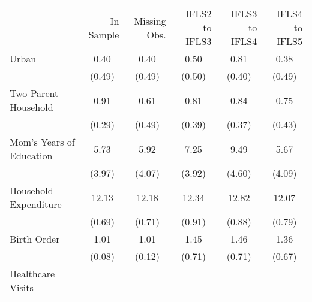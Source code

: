 \begin{tabular}{llllll}
\cline{1-6}
\multicolumn{1}{c}{} &
  \multicolumn{1}{|r}{In Sample} &
  \multicolumn{1}{r}{Missing Obs.} &
  \multicolumn{1}{r}{IFLS2 to IFLS3} &
  \multicolumn{1}{r}{IFLS3 to IFLS4} &
  \multicolumn{1}{r}{IFLS4 to IFLS5} \\
\cline{1-6}
\multicolumn{1}{l}{Urban} &
  \multicolumn{1}{|c}{0.40} &
  \multicolumn{1}{c}{0.40} &
  \multicolumn{1}{c}{0.50} &
  \multicolumn{1}{c}{0.81} &
  \multicolumn{1}{c}{0.38} \\
\multicolumn{1}{l}{} &
  \multicolumn{1}{|c}{(0.49)} &
  \multicolumn{1}{c}{(0.49)} &
  \multicolumn{1}{c}{(0.50)} &
  \multicolumn{1}{c}{(0.40)} &
  \multicolumn{1}{c}{(0.49)} \\
\multicolumn{1}{l}{Two-Parent Household} &
  \multicolumn{1}{|c}{0.91} &
  \multicolumn{1}{c}{0.61} &
  \multicolumn{1}{c}{0.81} &
  \multicolumn{1}{c}{0.84} &
  \multicolumn{1}{c}{0.75} \\
\multicolumn{1}{l}{} &
  \multicolumn{1}{|c}{(0.29)} &
  \multicolumn{1}{c}{(0.49)} &
  \multicolumn{1}{c}{(0.39)} &
  \multicolumn{1}{c}{(0.37)} &
  \multicolumn{1}{c}{(0.43)} \\
\multicolumn{1}{l}{Mom's Years of Education} &
  \multicolumn{1}{|c}{5.73} &
  \multicolumn{1}{c}{5.92} &
  \multicolumn{1}{c}{7.25} &
  \multicolumn{1}{c}{9.49} &
  \multicolumn{1}{c}{5.67} \\
\multicolumn{1}{l}{} &
  \multicolumn{1}{|c}{(3.97)} &
  \multicolumn{1}{c}{(4.07)} &
  \multicolumn{1}{c}{(3.92)} &
  \multicolumn{1}{c}{(4.60)} &
  \multicolumn{1}{c}{(4.09)} \\
\multicolumn{1}{l}{Household Expenditure} &
  \multicolumn{1}{|c}{12.13} &
  \multicolumn{1}{c}{12.18} &
  \multicolumn{1}{c}{12.34} &
  \multicolumn{1}{c}{12.82} &
  \multicolumn{1}{c}{12.07} \\
\multicolumn{1}{l}{} &
  \multicolumn{1}{|c}{(0.69)} &
  \multicolumn{1}{c}{(0.71)} &
  \multicolumn{1}{c}{(0.91)} &
  \multicolumn{1}{c}{(0.88)} &
  \multicolumn{1}{c}{(0.79)} \\
\multicolumn{1}{l}{Birth Order} &
  \multicolumn{1}{|c}{1.01} &
  \multicolumn{1}{c}{1.01} &
  \multicolumn{1}{c}{1.45} &
  \multicolumn{1}{c}{1.46} &
  \multicolumn{1}{c}{1.36} \\
\multicolumn{1}{l}{} &
  \multicolumn{1}{|c}{(0.08)} &
  \multicolumn{1}{c}{(0.12)} &
  \multicolumn{1}{c}{(0.71)} &
  \multicolumn{1}{c}{(0.71)} &
  \multicolumn{1}{c}{(0.67)} \\
\multicolumn{1}{l}{Healthcare Visits} &

\end{tabular}
